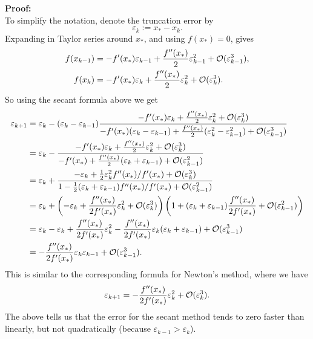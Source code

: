 \documentclass[
  letterpaper,
  DIV=11,
  numbers=noendperiod]{scrreprt}
\begin{document}
\textbf{Proof:}\\
To simplify the notation, denote the truncation error by \[
\varepsilon_k := x_* - x_k. 
\] Expanding in Taylor series around \(x_*\), and using \(f(x_*)=0\),
gives \[
\begin{aligned}
f(x_{k-1}) &= -f'(x_*)\varepsilon_{k-1} + \frac{f''(x_*)}{2}\varepsilon_{k-1}^2 + {\cal O}(\varepsilon_{k-1}^3),\\
f(x_{k}) &= -f'(x_*)\varepsilon_{k} + \frac{f''(x_*)}{2}\varepsilon_{k}^2 + {\cal O}(\varepsilon_{k}^3).
\end{aligned}
\] So using the secant formula above we get \[
\begin{aligned}
\varepsilon_{k+1} &= \varepsilon_k - (\varepsilon_{k}-\varepsilon_{k-1})\frac{-f'(x_*)\varepsilon_{k} + \frac{f''(x_*)}{2}\varepsilon_{k}^2 + {\cal O}(\varepsilon_{k}^3)}{-f'(x_*)(\varepsilon_{k}-\varepsilon_{k-1})+ \frac{f''(x_*)}{2}(\varepsilon_{k}^2 - \varepsilon_{k-1}^2) + {\cal O}(\varepsilon_{k-1}^3)}\\
&= \varepsilon_k - \frac{ -f'(x_*)\varepsilon_{k} + \frac{f''(x_*)}{2}\varepsilon_{k}^2 + {\cal O}(\varepsilon_{k}^3)}{-f'(x_*) + \frac{f''(x_*)}{2}(\varepsilon_k + \varepsilon_{k-1}) + {\cal O}(\varepsilon_{k-1}^2)}\\
&= \varepsilon_k + \frac{-\varepsilon_k + \tfrac12\varepsilon_k^2f''(x_*)/f'(x_*) + {\cal O}(\varepsilon_k^3)}{1 - \tfrac12(\varepsilon_k + \varepsilon_{k-1})f''(x_*)/f'(x_*) + {\cal O}(\varepsilon_{k-1}^2)}\\
&= \varepsilon_k + \left(-\varepsilon_k + \frac{f''(x_*)}{2f'(x_*)}\varepsilon_k^2 + {\cal O}(\varepsilon_k^3) \right)\left(1 + (\varepsilon_k + \varepsilon_{k-1})\frac{f''(x_*)}{2f'(x_*)} + {\cal O}(\varepsilon_{k-1}^2) \right)\\
&= \varepsilon_k - \varepsilon_k + \frac{f''(x_*)}{2f'(x_*)}\varepsilon_k^2 - \frac{f''(x_*)}{2f'(x_*)}\varepsilon_k(\varepsilon_k + \varepsilon_{k-1}) + {\cal O}(\varepsilon_{k-1}^3)\\
&= -\frac{f''(x_*)}{2f'(x_*)}\varepsilon_k\varepsilon_{k-1} + {\cal O}(\varepsilon_{k-1}^3).
\end{aligned}
\] This is similar to the corresponding formula for Newton's method,
where we have \[
\varepsilon_{k+1} = -\frac{f''(x_*)}{2f'(x_*)}\varepsilon_k^2 + {\cal O}(\varepsilon_k^3).
\] The above tells us that the error for the secant method tends to zero
faster than linearly, but not quadratically (because
\(\varepsilon_{k-1} > \varepsilon_k\)).
\end{document}
